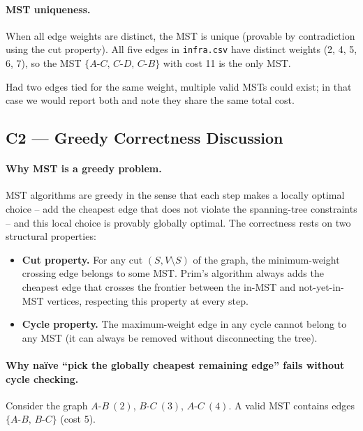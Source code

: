 \documentclass[11pt,a4paper]{article}
\begin{document}
\paragraph{MST uniqueness.}
When all edge weights are distinct, the MST is unique (provable by contradiction using the cut property). All five edges in \texttt{infra.csv} have distinct weights (2, 4, 5, 6, 7), so the MST $\{A\text{-}C,\, C\text{-}D,\, C\text{-}B\}$ with cost 11 is the only MST.

Had two edges tied for the same weight, multiple valid MSTs could exist; in that case we would report both and note they share the same total cost.

\subsection{C2 --- Greedy Correctness Discussion}

\paragraph{Why MST is a greedy problem.}
MST algorithms are greedy in the sense that each step makes a locally optimal choice -- add the cheapest edge that does not violate the spanning-tree constraints -- and this local choice is provably globally optimal. The correctness rests on two structural properties:
\begin{itemize}[noitemsep]
  \item \textbf{Cut property.} For any cut $(S, V\setminus S)$ of the graph, the minimum-weight crossing edge belongs to some MST. Prim's algorithm always adds the cheapest edge that crosses the frontier between the in-MST and not-yet-in-MST vertices, respecting this property at every step.
  \item \textbf{Cycle property.} The maximum-weight edge in any cycle cannot belong to any MST (it can always be removed without disconnecting the tree).
\end{itemize}

\paragraph{Why na\"ive ``pick the globally cheapest remaining edge'' fails without cycle checking.}
Consider the graph $A\text{-}B\ (2)$, $B\text{-}C\ (3)$, $A\text{-}C\ (4)$. A valid MST contains edges $\{A\text{-}B,\, B\text{-}C\}$ (cost 5).
\end{document}
